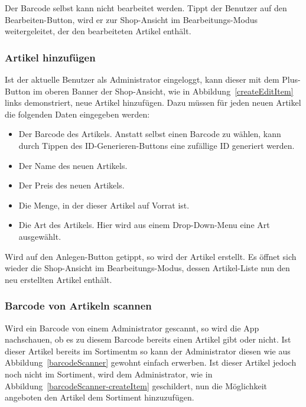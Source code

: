 Der Barcode selbst kann nicht bearbeitet werden.
Tippt der Benutzer auf den Bearbeiten-Button, wird er zur Shop-Ansicht im Bearbeitungs-Modus weitergeleitet, der den bearbeiteten Artikel enthält.


\subsubsection{Artikel hinzufügen} \label{subsubsec:shop-add-items}

Ist der aktuelle Benutzer als Administrator eingeloggt, kann dieser mit dem Plus-Button im oberen Banner der Shop-Ansicht, wie in Abbildung~\ref{createEditItem} links demonstriert, neue Artikel hinzufügen.
Dazu müssen für jeden neuen Artikel die folgenden Daten eingegeben werden:

\begin{itemize}
	\item Der Barcode des Artikels.
	Anstatt selbst einen Barcode zu wählen, kann durch Tippen des ID-Generieren-Buttons eine zufällige ID generiert werden.

	\item Der Name des neuen Artikels.

	\item Der Preis des neuen Artikels.

	\item Die Menge, in der dieser Artikel auf Vorrat ist.

	\item Die Art des Artikels.
	Hier wird aus einem Drop-Down-Menu eine Art ausgewählt.
\end{itemize}

Wird auf den Anlegen-Button getippt, so wird der Artikel erstellt.
Es öffnet sich wieder die Shop-Ansicht im Bearbeitungs-Modus, dessen Artikel-Liste nun den neu erstellten Artikel enthält.

\subsubsection{Barcode von Artikeln scannen} \label{subsubsec:shop-admin-scan-item}

Wird ein Barcode von einem Administrator gescannt, so wird die App nachschauen, ob es zu diesem Barcode bereits einen Artikel gibt oder nicht.
Ist dieser Artikel bereits im Sortimentm so kann der Administrator diesen wie aus Abbildung~\ref{barcodeScanner} gewohnt einfach erwerben.
Ist dieser Artikel jedoch noch nicht im Sortiment, wird dem Administrator, wie in Abbildung~\ref{barcodeScanner-createItem} geschildert, nun die Möglichkeit angeboten den Artikel dem Sortiment hinzuzufügen.

